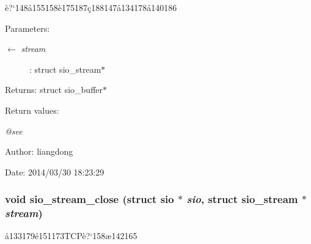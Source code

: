 \`{e}?`148\aa{}155158\`{e}175187\c{c}188147\aa{}134178\aa{}140186 

\begin{Desc}
\item[Parameters:]
\begin{description}
\item[\mbox{$\leftarrow$} {\em stream}]: struct sio\_\-stream$\ast$ \end{description}
\end{Desc}
\begin{Desc}
\item[Returns:]struct sio\_\-buffer$\ast$ \end{Desc}
\begin{Desc}
\item[Return values:]
\begin{description}
\item[{\em @see}]\end{description}
\end{Desc}
\begin{Desc}
\item[Author:]liangdong \end{Desc}
\begin{Desc}
\item[Date:]2014/03/30 18:23:29 \end{Desc}
\subsubsection{\setlength{\rightskip}{0pt plus 5cm}void sio\_\-stream\_\-close (struct sio $\ast$ {\em sio}, struct sio\_\-stream $\ast$ {\em stream})}\label{sio__stream_8h_a11}


\aa{}133179\'{e}151173TCP\`{e}?`158\ae{}142165 

